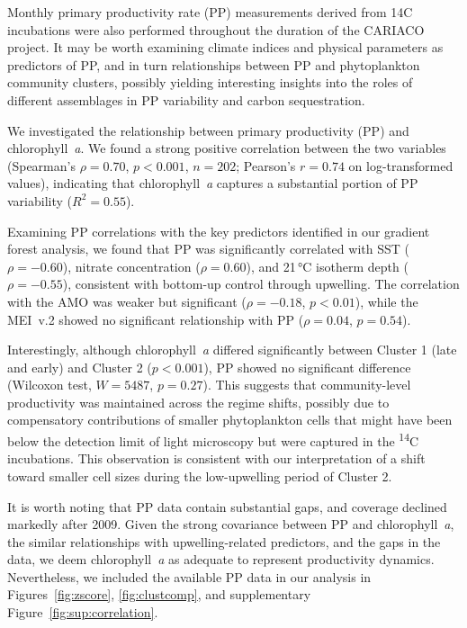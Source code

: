 \documentclass[12pt,english]{reviewresponse}
\begin{document}
\begin{revcomment}
Monthly primary productivity rate (PP) measurements derived from 14C incubations were also performed throughout the duration of the CARIACO project. It may be worth examining climate indices and physical parameters as predictors of PP, and in turn relationships between PP and phytoplankton community clusters, possibly yielding interesting insights into the roles of different assemblages in PP variability and carbon sequestration.
\end{revcomment}
\begin{revresponse}
	We investigated the relationship between primary productivity (PP) and chlorophyll~\textit{a}. We found a strong positive correlation between the two variables (Spearman's $\rho = 0.70$, $p < 0.001$, $n = 202$; Pearson's $r = 0.74$ on log-transformed values), indicating that chlorophyll~\textit{a} captures a substantial portion of PP variability ($R^2 = 0.55$).

    Examining PP correlations with the key predictors identified in our gradient forest analysis, we found that PP was significantly correlated with SST ($\rho = -0.60$), nitrate concentration ($\rho = 0.60$), and 21\,°C isotherm depth ($\rho = -0.55$), consistent with bottom-up control through upwelling. The correlation with the AMO was weaker but significant ($\rho = -0.18$, $p < 0.01$), while the MEI~v.2 showed no significant relationship with PP ($\rho = 0.04$, $p = 0.54$).

    Interestingly, although chlorophyll~\textit{a} differed significantly between Cluster 1 (late and early) and Cluster 2 ($p < 0.001$), PP showed no significant difference (Wilcoxon test, $W = 5487$, $p = 0.27$). This suggests that community-level productivity was maintained across the regime shifts, possibly due to compensatory contributions of smaller phytoplankton cells that might have been below the detection limit of light microscopy but were captured in the \textsuperscript{14}C incubations. This observation is consistent with our interpretation of a shift toward smaller cell sizes during the low-upwelling period of Cluster 2.

    It is worth noting that PP data contain substantial gaps, and coverage declined markedly after 2009. Given the strong covariance between PP and chlorophyll~\textit{a}, the similar relationships with upwelling-related predictors, and the gaps in the data, we deem chlorophyll~\textit{a} as adequate to represent productivity dynamics. Nevertheless, we included the available PP data in our analysis in Figures~\ref{fig:zscore}, \ref{fig:clustcomp}, and supplementary Figure~\ref{fig:sup:correlation}.
\end{revresponse}
\end{document}
